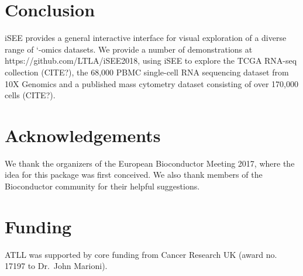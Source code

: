 \documentclass{bioinfo}
\begin{document}
\section{Conclusion}
iSEE provides a general interactive interface for visual exploration of a diverse range of `-omics datasets. 
We provide a number of demonstrations at https://github.com/LTLA/iSEE2018, using iSEE to explore the TCGA RNA-seq collection (CITE?), the 68,000 PBMC single-cell RNA sequencing dataset from 10X Genomics \citep{zheng2017massively} and a published mass cytometry dataset consisting of over 170,000 cells (CITE?). 

\section*{Acknowledgements}
We thank the organizers of the European Bioconductor Meeting 2017, where the idea for this package was first conceived.
We also thank members of the Bioconductor community for their helpful suggestions. 
\vspace*{-12pt}

\section*{Funding}
ATLL was supported by core funding from Cancer Research UK (award no. 17197 to Dr.\ John Marioni).
\vspace*{-12pt}

%
%

%
%
%
%
%

\end{document}
